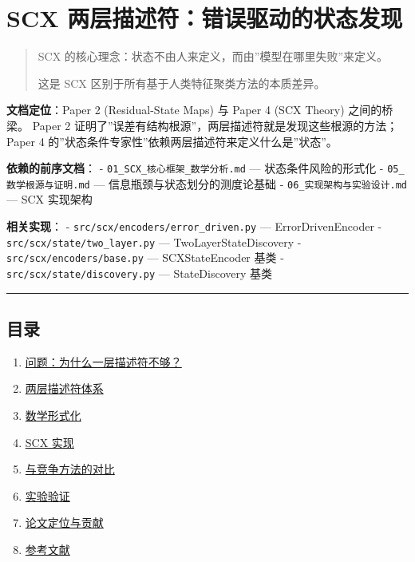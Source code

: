 \documentclass[
  12pt,
]{ctexart}
\author{SCX}
\date{2026}
\providecommand{\tightlist}{%
  \setlength{\itemsep}{0pt}\setlength{\parskip}{0pt}}
\begin{document}
\section{SCX
两层描述符：错误驱动的状态发现}\label{scx-ux4e24ux5c42ux63cfux8ff0ux7b26ux9519ux8befux9a71ux52a8ux7684ux72b6ux6001ux53d1ux73b0}

\begin{quote}
SCX 的核心理念：状态不由人来定义，而由''模型在哪里失败''来定义。

这是 SCX 区别于所有基于人类特征聚类方法的本质差异。
\end{quote}

\textbf{文档定位}：Paper 2 (Residual-State Maps) 与 Paper 4 (SCX Theory)
之间的桥梁。 Paper 2
证明了''误差有结构根源''，两层描述符就是发现这些根源的方法； Paper 4
的''状态条件专家性''依赖两层描述符来定义什么是''状态''。

\textbf{依赖的前序文档}： - \texttt{01\_SCX\_核心框架\_数学分析.md} ---
状态条件风险的形式化 - \texttt{05\_数学根源与证明.md} ---
信息瓶颈与状态划分的测度论基础 - \texttt{06\_实现架构与实验设计.md} ---
SCX 实现架构

\textbf{相关实现}： - \texttt{src/scx/encoders/error\_driven.py} ---
ErrorDrivenEncoder - \texttt{src/scx/state/two\_layer.py} ---
TwoLayerStateDiscovery - \texttt{src/scx/encoders/base.py} ---
SCXStateEncoder 基类 - \texttt{src/scx/state/discovery.py} ---
StateDiscovery 基类

\begin{center}\rule{0.5\linewidth}{0.5pt}\end{center}

\subsection{目录}\label{ux76eeux5f55}

\begin{enumerate}
\def\labelenumi{\arabic{enumi}.}
\tightlist
\item
  \hyperref[1-ux95eeux9898ux4e3aux4ec0ux4e48ux4e00ux5c42ux63cfux8ff0ux7b26ux4e0dux591f]{问题：为什么一层描述符不够？}
\item
  \hyperref[2-ux4e24ux5c42ux63cfux8ff0ux7b26ux4f53ux7cfb]{两层描述符体系}
\item
  \hyperref[3-ux6570ux5b66ux5f62ux5f0fux5316]{数学形式化}
\item
  \hyperref[4-scx-ux5b9eux73b0]{SCX 实现}
\item
  \hyperref[5-ux4e0eux7adeux4e89ux65b9ux6cd5ux7684ux5bf9ux6bd4]{与竞争方法的对比}
\item
  \hyperref[6-ux5b9eux9a8cux9a8cux8bc1]{实验验证}
\item
  \hyperref[7-ux8bbaux6587ux5b9aux4f4dux4e0eux8d21ux732e]{论文定位与贡献}
\item
  \hyperref[8-ux53c2ux8003ux6587ux732e]{参考文献}
\end{enumerate}
\end{document}
